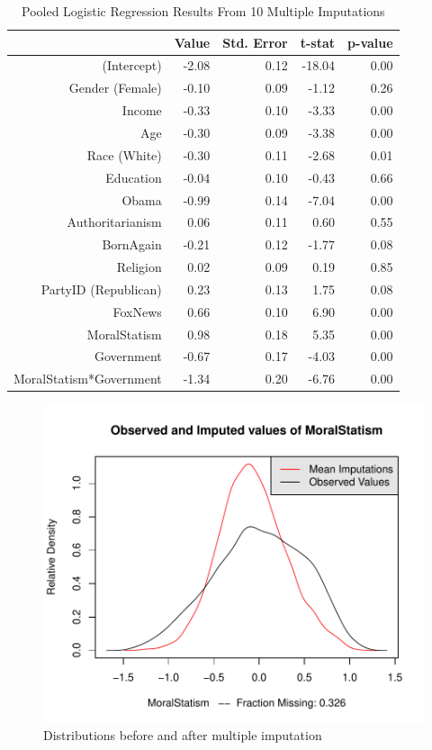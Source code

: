 \documentclass[12pt,]{article}
\begin{document}
\clearpage

\begin{table}[ht]
\centering
\begin{tabular}{rrrrr}
  \hline
 & Value & Std. Error & t-stat & p-value \\ 
  \hline
(Intercept) & -2.08 & 0.12 & -18.04 & 0.00 \\ 
  Gender (Female) & -0.10 & 0.09 & -1.12 & 0.26 \\ 
  Income & -0.33 & 0.10 & -3.33 & 0.00 \\ 
  Age & -0.30 & 0.09 & -3.38 & 0.00 \\ 
  Race (White) & -0.30 & 0.11 & -2.68 & 0.01 \\ 
  Education & -0.04 & 0.10 & -0.43 & 0.66 \\ 
  Obama & -0.99 & 0.14 & -7.04 & 0.00 \\ 
  Authoritarianism & 0.06 & 0.11 & 0.60 & 0.55 \\ 
  BornAgain & -0.21 & 0.12 & -1.77 & 0.08 \\ 
  Religion & 0.02 & 0.09 & 0.19 & 0.85 \\ 
  PartyID (Republican) & 0.23 & 0.13 & 1.75 & 0.08 \\ 
  FoxNews & 0.66 & 0.10 & 6.90 & 0.00 \\ 
  MoralStatism & 0.98 & 0.18 & 5.35 & 0.00 \\ 
  Government & -0.67 & 0.17 & -4.03 & 0.00 \\ 
  MoralStatism*Government & -1.34 & 0.20 & -6.76 & 0.00 \\ 
   \hline
\end{tabular}
\caption{Pooled Logistic Regression Results From 10 Multiple Imputations} 
\end{table}

\clearpage

\begin{figure}[htbp]
\centering
\includegraphics{figures/missing2-1.pdf}
\caption{Distributions before and after multiple imputation}
\end{figure}
\end{document}
